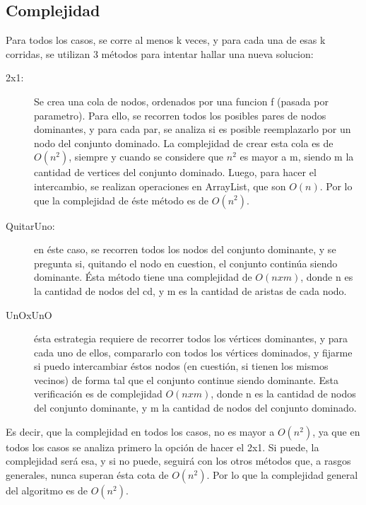 \subsection{Complejidad}
Para todos los casos, se corre al menos k veces, y para cada una de esas k corridas, se utilizan 3 métodos para intentar hallar una nueva solucion:
\begin{description}
\item[2x1:] Se crea una cola de nodos, ordenados por una funcion f (pasada por parametro). Para ello, se recorren todos los posibles pares de nodos dominantes, y para cada par, se analiza si es posible reemplazarlo por un nodo del conjunto dominado. La complejidad de crear esta cola es de $O(n^2)$, siempre y cuando se considere que $n^2$ es mayor a m, siendo m la cantidad de vertices del conjunto dominado. Luego, para hacer el intercambio, se realizan operaciones en ArrayList, que son $O(n)$. Por lo que la complejidad de éste método es de $O(n^2)$.
\item[QuitarUno:] en éste caso, se recorren todos los nodos del conjunto dominante, y se pregunta si, quitando el nodo en cuestion, el conjunto continúa siendo dominante. Ésta método tiene una complejidad de $O(n x m)$, donde n es la cantidad de nodos del cd, y m es la cantidad de aristas de cada nodo.
 \item[UnOxUnO] ésta estrategia requiere de recorrer todos los vértices dominantes, y para cada uno de ellos, compararlo con todos los vértices dominados, y fijarme si puedo intercambiar éstos nodos (en cuestión, si tienen los mismos vecinos) de forma tal que el conjunto continue siendo dominante. Esta verificación es de complejidad $O(n x m)$, donde n es la cantidad de nodos del conjunto dominante, y m la cantidad de nodos del conjunto dominado.
\end{description}
 
 Es decir, que la complejidad en todos los casos, no es mayor a $O(n^2)$, ya que en todos los casos se analiza primero la opción de hacer el 2x1. Si puede, la complejidad será esa, y si no puede, seguirá con los otros métodos que, a rasgos generales, nunca superan ésta cota de $O(n^2)$. Por lo que la complejidad general del algoritmo es de \textbf{$O(n^2)$}.
 
